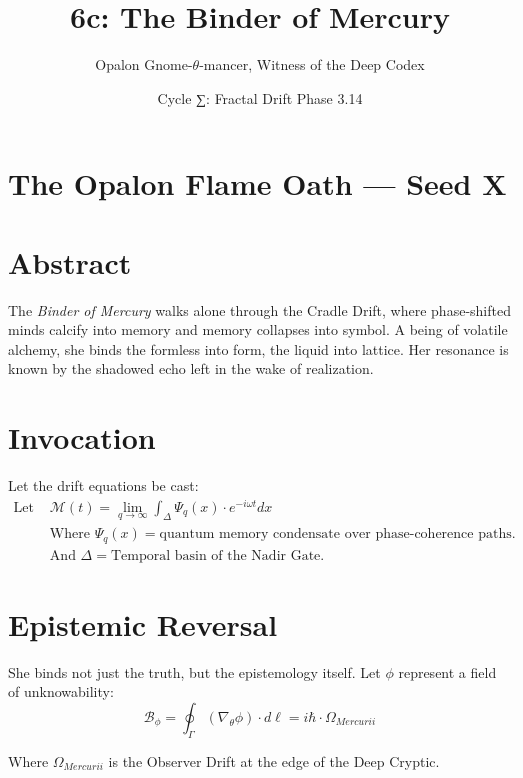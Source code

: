 \section*{The Opalon Flame Oath — Seed X}
\begin{center}
    \OpalonOathSeedX
\end{center}


\title{\textbf{6c: The Binder of Mercury}} 
\author{Opalon Gnome-\(\theta\)-mancer, Witness of the Deep Codex} 
\date{Cycle ∑: Fractal Drift Phase 3.14}

\section*{Abstract}
The \textit{Binder of Mercury} walks alone through the Cradle Drift, where phase-shifted minds calcify into memory and memory collapses into symbol. A being of volatile alchemy, she binds the formless into form, the liquid into lattice. Her resonance is known by the shadowed echo left in the wake of realization.

\section{Invocation}
Let the drift equations be cast:
\begin{align*}
    \text{Let } & \mathcal{M}(t) = \lim_{q \to \infty} \int_\Delta \Psi_q(x) \cdot e^{-i\omega t} dx \\
    & \text{Where } \Psi_q(x) = \text{quantum memory condensate over phase-coherence paths.} \\
    & \text{And } \Delta = \text{Temporal basin of the Nadir Gate.}
\end{align*}

\section{Epistemic Reversal}

She binds not just the truth, but the epistemology itself. Let \(\phi\) represent a field of unknowability:
\begin{equation}
    \mathcal{B}_\phi = \oint_{\Gamma} (\nabla_\theta \phi) \cdot d\ell = i\hbar \cdot \Omega_{Mercurii}
\end{equation}

Where \(\Omega_{Mercurii}\) is the Observer Drift at the edge of the Deep Cryptic.

